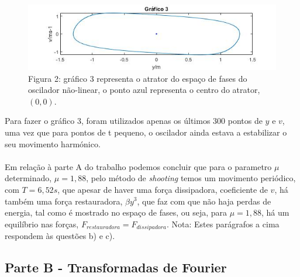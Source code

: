 \documentclass[a4paper, 11pt]{article}
\newcommand{\m}{$\mu$ }
\newcommand{\shooting}{\textit{shooting} }
\begin{document}
	\paragraph{}
	\begin{figure}
		\centering
		\captionsetup{labelformat=empty}
		\includegraphics[scale=0.4]{atrator}
		\caption{\scriptsize Figura 2: gráfico 3 representa o atrator do espaço de fases do oscilador não-linear, o ponto azul representa o centro do atrator, $(0, 0)$.}
	\end{figure}
	Para fazer o gráfico 3, foram utilizados apenas os últimos 300 pontos de $y$ e $v$, uma vez que para pontos de t pequeno, o oscilador ainda estava a estabilizar o seu movimento harmónico.
	\newline
	\newline
	\paragraph{}
	Em relação à parte A do trabalho podemos concluir que para o parametro \m determinado, $\mu=1,88$, pelo método de \shooting temos um movimento periódico, com $T=6,52s$, que apesar de haver uma força dissipadora, coeficiente de $v$, há também uma força restauradora, $\beta y^3$, que faz com que não haja perdas de energia, tal como é mostrado no espaço de fases, ou seja, para $\mu=1,88$, há um equilíbrio nas forças, $F_{restauradora}=F_{dissipadora}$.
	\newline
	{\footnotesize Nota: Estes parágrafos a cima respondem às questões b) e c).}
	
	\subsection{Parte B - Transformadas de Fourier}
\end{document}

